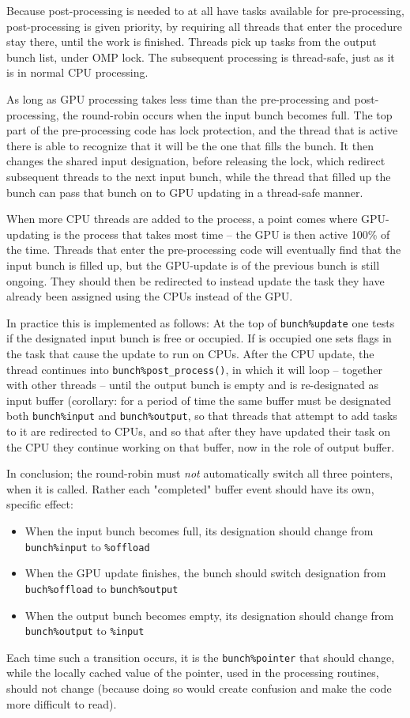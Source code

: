 \documentclass[paper=a4,fontsize=11pt]{scrartcl}
\numberwithin{equation}{section}		%
\numberwithin{figure}{section}			%
\numberwithin{table}{section}				%
\begin{document}
Because post-processing is needed to at all have tasks available for pre-processing, post-processing is given priority, by requiring all threads that enter the procedure stay there, until the work is finished.  Threads pick up tasks from the output bunch list, under OMP lock. The subsequent processing is thread-safe, just as it is in normal CPU processing. 

As long as GPU processing takes less time than the pre-processing and post-processing, the round-robin occurs when the input bunch becomes full.  The top part of the pre-processing code has lock protection, and the thread that is active there is able to recognize that it will be the one that fills the bunch.  It then changes the shared input designation, before releasing the lock, which redirect subsequent threads to the next input bunch, while the thread that filled up the bunch can pass that bunch on to GPU updating in a thread-safe manner.

When more CPU threads are added to the process, a point comes where GPU-updating is the process that takes most time -- the GPU is then active 100\% of the time.  Threads that enter the pre-processing code will eventually find that the input bunch is filled up, but the GPU-update is of the previous bunch is still ongoing.  They should then be redirected to instead update the task they have already been assigned using the CPUs instead of the GPU.

In practice this is implemented as follows: At the top of \verb|bunch%update| one tests if the designated input bunch is free or occupied.  If is occupied one sets flags in the task that cause the update to run on CPUs.  After the CPU update, the thread continues into \verb|bunch%post_process()|, in which it will loop -- together with other threads -- until the output bunch is empty and is re-designated as input buffer (corollary: for a period of time the same buffer must be designated both \verb|bunch%input| and \verb|bunch%output|, so that threads that attempt to add tasks to it are redirected to CPUs, and so that after they have updated their task on the CPU they continue working on that buffer, now in the role of output buffer.

In conclusion; the round-robin must \textit{not} automatically switch all three pointers, when it is called.  Rather each "completed" buffer event should have its own, specific effect:
\begin{itemize}
    \item When the input bunch becomes full, its designation should change from \verb|bunch%input| to \verb|%offload|
    \item When the GPU update finishes, the bunch should switch designation from \verb|buch%offload| to \verb|bunch%output|
    \item When the output bunch becomes empty, its designation should change from \verb|bunch%output| to \verb|%input|
\end{itemize}
Each time such a transition occurs, it is the \verb|bunch%pointer| that should change, while the locally cached value of the pointer, used in the processing routines, should not change (because doing so would create confusion and make the code more difficult to read).
\end{document}
